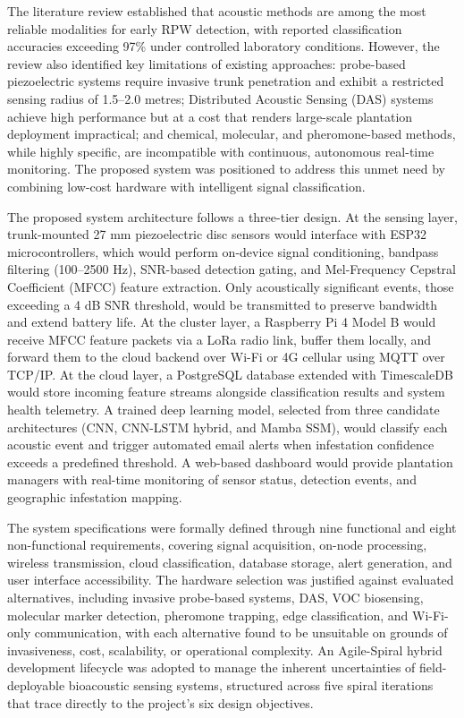 \documentclass[12pt,a4paper,oneside]{memoir}
\begin{document}
The literature review established that acoustic methods are among the most reliable modalities for early RPW detection, with reported classification accuracies exceeding 97\% under controlled laboratory conditions. However, the review also identified key limitations of existing approaches: probe-based piezoelectric systems require invasive trunk penetration and exhibit a restricted sensing radius of 1.5--2.0 metres; Distributed Acoustic Sensing (DAS) systems achieve high performance but at a cost that renders large-scale plantation deployment impractical; and chemical, molecular, and pheromone-based methods, while highly specific, are incompatible with continuous, autonomous real-time monitoring. The proposed system was positioned to address this unmet need by combining low-cost hardware with intelligent signal classification.

The proposed system architecture follows a three-tier design. At the sensing layer, trunk-mounted 27 mm piezoelectric disc sensors would interface with ESP32 microcontrollers, which would perform on-device signal conditioning, bandpass filtering (100--2500 Hz), SNR-based detection gating, and Mel-Frequency Cepstral Coefficient (MFCC) feature extraction. Only acoustically significant events, those exceeding a 4 dB SNR threshold, would be transmitted to preserve bandwidth and extend battery life. At the cluster layer, a Raspberry Pi 4 Model B would receive MFCC feature packets via a LoRa radio link, buffer them locally, and forward them to the cloud backend over Wi-Fi or 4G cellular using MQTT over TCP/IP. At the cloud layer, a PostgreSQL database extended with TimescaleDB would store incoming feature streams alongside classification results and system health telemetry. A trained deep learning model, selected from three candidate architectures (CNN, CNN-LSTM hybrid, and Mamba SSM), would classify each acoustic event and trigger automated email alerts when infestation confidence exceeds a predefined threshold. A web-based dashboard would provide plantation managers with real-time monitoring of sensor status, detection events, and geographic infestation mapping.

The system specifications were formally defined through nine functional and eight non-functional requirements, covering signal acquisition, on-node processing, wireless transmission, cloud classification, database storage, alert generation, and user interface accessibility. The hardware selection was justified against evaluated alternatives, including invasive probe-based systems, DAS, VOC biosensing, molecular marker detection, pheromone trapping, edge classification, and Wi-Fi-only communication, with each alternative found to be unsuitable on grounds of invasiveness, cost, scalability, or operational complexity. An Agile-Spiral hybrid development lifecycle was adopted to manage the inherent uncertainties of field-deployable bioacoustic sensing systems, structured across five spiral iterations that trace directly to the project’s six design objectives.
\end{document}
